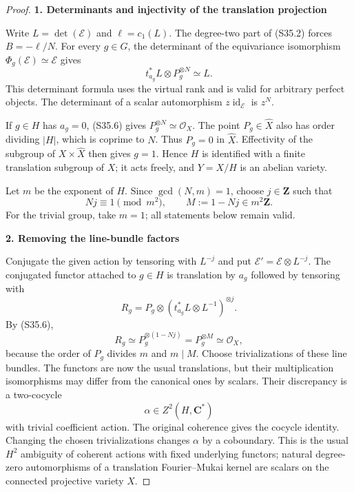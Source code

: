 \begin{proof}
\par\medskip\noindent\textbf{1. Determinants and injectivity of the translation projection}\quad

Write \(L=\det(\mathcal E)\) and \(\ell=c_1(L)\). The degree-two part of (S35.2) forces \(B=-\ell/N\). For every \(g\in G\), the determinant of the equivariance isomorphism \(\Phi_g(\mathcal E)\simeq\mathcal E\) gives \[
 t_{a_g}^*L\otimes P_g^{\otimes N}\simeq L.
 \tag{S35.6}
\] This determinant formula uses the virtual rank and is valid for arbitrary perfect objects. The determinant of a scalar automorphism \(z\operatorname{id}_{\mathcal E}\) is \(z^N\).

If \(g\in H\) has \(a_g=0\), (S35.6) gives \(P_g^{\otimes N}\simeq\mathcal O_X\). The point \(P_g\in\widehat X\) also has order dividing \(|H|\), which is coprime to \(N\). Thus \(P_g=0\) in \(\widehat X\). Effectivity of the subgroup of \(X\times\widehat X\) then gives \(g=1\). Hence \(H\) is identified with a finite translation subgroup of \(X\); it acts freely, and \(Y=X/H\) is an abelian variety.

Let \(m\) be the exponent of \(H\). Since \(\gcd(N,m)=1\), choose \(j\in\mathbf Z\) such that \[
 Nj\equiv1\pmod{m^2},\qquad M:=1-Nj\in m^2\mathbf Z.
 \tag{S35.7}
\] For the trivial group, take \(m=1\); all statements below remain valid.

\par\medskip\noindent\textbf{2. Removing the line-bundle factors}\quad

Conjugate the given action by tensoring with \(L^{-j}\) and put \(\mathcal E'=\mathcal E\otimes L^{-j}\). The conjugated functor attached to \(g\in H\) is translation by \(a_g\) followed by tensoring with \[
 R_g=P_g\otimes(t_{a_g}^*L\otimes L^{-1})^{\otimes j}.
\] By (S35.6), \[
 R_g\simeq P_g^{\otimes(1-Nj)}=P_g^{\otimes M}
                  \simeq\mathcal O_X,
 \tag{S35.8}
\] because the order of \(P_g\) divides \(m\) and \(m\mid M\). Choose trivializations of these line bundles. The functors are now the usual translations, but their multiplication isomorphisms may differ from the canonical ones by scalars. Their discrepancy is a two-cocycle \[
 \alpha\in Z^2(H,\mathbf C^*)
 \tag{S35.9}
\] with trivial coefficient action. The original coherence gives the cocycle identity. Changing the chosen trivializations changes \(\alpha\) by a coboundary. This is the usual \(H^2\) ambiguity of coherent actions with fixed underlying functors; natural degree-zero automorphisms of a translation Fourier--Mukai kernel are scalars on the connected projective variety \(X\).


\end{proof}
